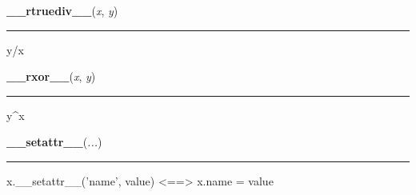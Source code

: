     \begin{boxedminipage}{\textwidth}

    \raggedright \textbf{\_\_rtruediv\_\_}(\textit{x}, \textit{y})

    \vspace{-1.5ex}

    \rule{\textwidth}{0.5\fboxrule}

y/x
    \vspace{1ex}

    \end{boxedminipage}

    \label{numpy:ndarray:__rxor__}

    \vspace{0.5ex}

    \begin{boxedminipage}{\textwidth}

    \raggedright \textbf{\_\_rxor\_\_}(\textit{x}, \textit{y})

    \vspace{-1.5ex}

    \rule{\textwidth}{0.5\fboxrule}

y{\textasciicircum}x
    \vspace{1ex}

    \end{boxedminipage}

    \label{object:__setattr__}

    \vspace{0.5ex}

    \begin{boxedminipage}{\textwidth}

    \raggedright \textbf{\_\_setattr\_\_}(\textit{...})

    \vspace{-1.5ex}

    \rule{\textwidth}{0.5\fboxrule}

x.{\_}{\_}setattr{\_}{\_}('name', value) {\textless}=={\textgreater} x.name = value
    \vspace{1ex}

    \end{boxedminipage}

    \label{numpy:ndarray:__setitem__}

    \vspace{0.5ex}


